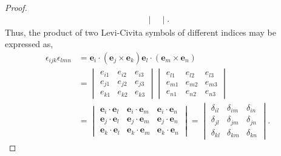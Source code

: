 \documentclass[12pt,a4paper]{report}
\theoremstyle{definition}
\theoremstyle{remark}
\theoremstyle{remark}
\begin{document}
\begin{appendices}
\begin{proof}
\begin{align*}
\begin{vmatrix}
\end{vmatrix}.
\end{align*}
Thus, the product of two Levi-Civita symbols of different indices may be expressed as,
\begin{align*}
\epsilon_{ijk}\epsilon_{lmn} &= \textbf{e}_i\cdot\left(\textbf{e}_j\times\textbf{e}_k\right)\textbf{e}_l\cdot\left(\textbf{e}_m\times\textbf{e}_n\right) \\
&= \begin{vmatrix} 
e_{i1} & e_{i2} & e_{i3}\\
e_{j1} & e_{j2} & e_{j3}\\
e_{k1} & e_{k2} & e_{k3}
\end{vmatrix}
\begin{vmatrix} 
e_{l1} & e_{l2} & e_{l3}\\
e_{m1} & e_{m2} & e_{m3}\\
e_{n1} & e_{n2} & e_{n3}
\end{vmatrix} \\
&= \begin{vmatrix} 
\textbf{e}_i\cdot\textbf{e}_l & \textbf{e}_i\cdot\textbf{e}_m & \textbf{e}_i\cdot\textbf{e}_n\\
\textbf{e}_j\cdot\textbf{e}_l & \textbf{e}_j\cdot\textbf{e}_m & \textbf{e}_j\cdot\textbf{e}_n\\
\textbf{e}_k\cdot\textbf{e}_l & \textbf{e}_k\cdot\textbf{e}_m & \textbf{e}_k\cdot\textbf{e}_n
\end{vmatrix}
= \begin{vmatrix} 
\delta_{il} & \delta_{im} & \delta_{in}\\
\delta_{jl} & \delta_{jm} & \delta_{jn}\\
\delta_{kl} & \delta_{km} & \delta_{kn}
\end{vmatrix}.
\end{align*}
\end{proof}


\end{appendices}
\end{document}
